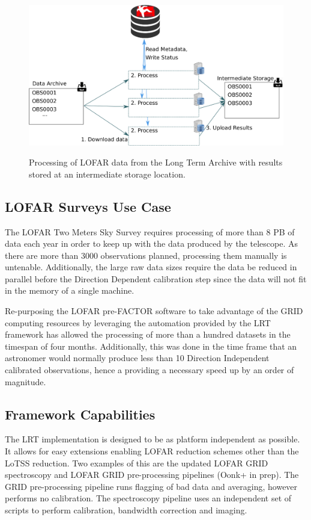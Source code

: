 \begin{figure}
 \includegraphics[width=.76\textwidth]{ch3/figures/token_process.eps}\\
    \caption[Schematic of data movement.]{Processing of LOFAR data from the Long Term Archive with results stored at an intermediate storage location.}
 \label{fig:ch3_tok_process}
\end{figure}

\subsection{LOFAR Surveys Use Case}\label{sec:ch3_use}
The LOFAR Two Meters Sky Survey requires processing of more than 8 PB of data each year in order to keep up with the data produced by the telescope. As there are more than 3000 observations planned, processing them manually is untenable. Additionally, the large raw data sizes require the data be reduced in parallel before the Direction Dependent calibration step since the data will not fit in the memory of a single machine. 

Re-purposing the LOFAR pre-FACTOR software to take advantage of the GRID computing resources by leveraging the automation provided by the LRT framework has allowed the processing of more than a hundred datasets in the timespan of four months. Additionally, this was done in the time frame that an astronomer would normally produce less than 10 Direction Independent calibrated observations, hence a providing a necessary speed up by an order of magnitude.


\subsection{Framework Capabilities}\label{sec:ch3_capabilities}

The LRT implementation is designed to be as platform independent as possible. It allows for easy extensions enabling LOFAR reduction schemes other than the LoTSS reduction. Two examples of this are the updated LOFAR GRID spectroscopy and LOFAR GRID pre-processing pipelines (Oonk+ in prep). The GRID pre-processing pipeline runs flagging of bad data and averaging, however performs no calibration. The spectroscopy pipeline uses an independent set of scripts to perform calibration,  bandwidth correction and imaging. 

